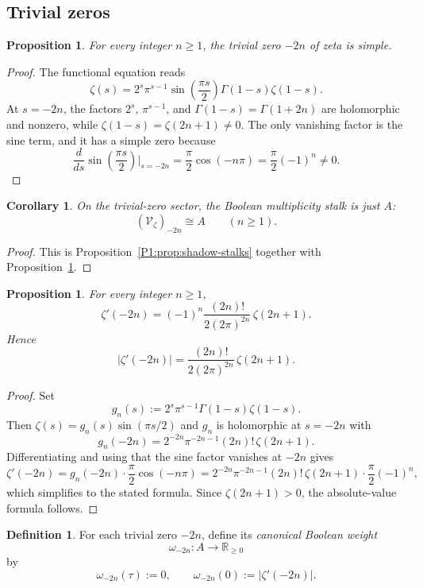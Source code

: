 \documentclass[11pt,a4paper]{article}
\numberwithin{equation}{section}
\newtheorem{proposition}[theorem]{Proposition}
\newtheorem{corollary}[theorem]{Corollary}
\theoremstyle{definition}
\newtheorem{definition}[theorem]{Definition}
\theoremstyle{remark}
\newcommand{\RR}{\mathbb R}
\newcommand{\cV}{\mathcal V}
\newcommand{\taup}{\tau}
\begin{document}
\subsection{Trivial zeros}

\begin{proposition}\label{P1:prop:trivial-simple}
For every integer $n\ge1$, the trivial zero $-2n$ of zeta is simple.
\end{proposition}

\begin{proof}
The functional equation reads
\[
\zeta(s)=2^s\pi^{s-1}\sin\!\left(\frac{\pi s}{2}\right)\Gamma(1-s)\zeta(1-s).
\]
At $s=-2n$, the factors $2^s$, $\pi^{s-1}$, and $\Gamma(1-s)=\Gamma(1+2n)$ are holomorphic and nonzero, while $\zeta(1-s)=\zeta(2n+1)\neq0$.  The only vanishing factor is the sine term, and it has a simple zero because
\[
\frac{d}{ds}\sin\!\left(\frac{\pi s}{2}\right)\Big|_{s=-2n}=\frac\pi2\cos(-n\pi)=\frac\pi2(-1)^n\neq0.
\]
\end{proof}

\begin{corollary}\label{P1:cor:trivial-stalk}
On the trivial-zero sector, the Boolean multiplicity stalk is just $A$:
\[
(\cV_\zeta)_{-2n}\cong A\qquad(n\ge1).
\]
\end{corollary}

\begin{proof}
This is Proposition~\ref{P1:prop:shadow-stalks} together with Proposition~\ref{P1:prop:trivial-simple}.
\end{proof}

\begin{proposition}\label{P1:prop:trivial-derivative}
For every integer $n\ge1$,
\[
\zeta'(-2n)=(-1)^n\frac{(2n)!}{2(2\pi)^{2n}}\,\zeta(2n+1).
\]
Hence
\[
|\zeta'(-2n)|=\frac{(2n)!}{2(2\pi)^{2n}}\,\zeta(2n+1).
\]
\end{proposition}

\begin{proof}
Set
\[
g_n(s):=2^s\pi^{s-1}\Gamma(1-s)\zeta(1-s).
\]
Then $\zeta(s)=g_n(s)\sin(\pi s/2)$ and $g_n$ is holomorphic at $s=-2n$ with
\[
g_n(-2n)=2^{-2n}\pi^{-2n-1}(2n)!\,\zeta(2n+1).
\]
Differentiating and using that the sine factor vanishes at $-2n$ gives
\[
\zeta'(-2n)=g_n(-2n)\cdot \frac\pi2\cos(-n\pi)
=2^{-2n}\pi^{-2n-1}(2n)!\,\zeta(2n+1)\cdot\frac\pi2(-1)^n,
\]
which simplifies to the stated formula.  Since $\zeta(2n+1)>0$, the absolute-value formula follows.
\end{proof}

\begin{definition}
For each trivial zero $-2n$, define its \emph{canonical Boolean weight}
\[
\omega_{-2n}:A\to\RR_{\ge0}
\]
by
\[
\omega_{-2n}(\taup):=0,
\qquad
\omega_{-2n}(0):=|\zeta'(-2n)|.
\]
\end{definition}
\end{document}
